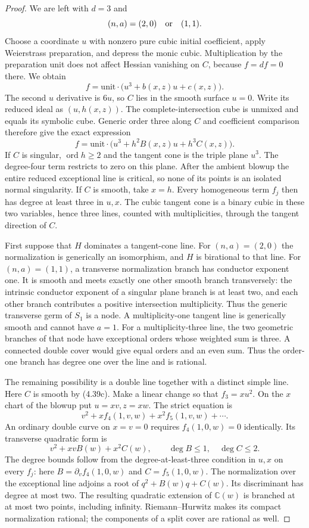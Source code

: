 \begin{proof}
We are left with $d=3$ and
\[
                   (n,a)=(2,0)\quad\hbox{or}\quad(1,1).
\]
Choose a coordinate $u$ with nonzero pure cubic initial
coefficient, apply Weierstrass preparation, and depress the
monic cubic. Multiplication by the preparation unit does not
affect Hessian vanishing on $C$, because $f=df=0$ there.
We obtain
\[
 f=\text{unit}\cdot\bigl(u^3+b(x,z)u+c(x,z)\bigr).
\]
The second $u$ derivative is $6u$, so $C$ lies in the smooth
surface $u=0$. Write its reduced ideal as $(u,h(x,z))$.
The complete-intersection cube is unmixed and equals its
symbolic cube. Generic order three along $C$ and coefficient
comparison therefore give the exact expression
\[
 f=\text{unit}\cdot
       \bigl(u^3+h^2B(x,z)u+h^3C(x,z)\bigr).           \tag{4.39c}
\]
If $C$ is singular, $\operatorname{ord}h\ge2$ and the
tangent cone is the triple plane $u^3$. The degree-four
term restricts to zero on this plane. After the ambient
blowup the entire reduced exceptional line is critical,
so none of its points is an isolated normal singularity.
If $C$ is smooth, take $x=h$. Every homogeneous term $f_j$
then has degree at least three in $u,x$. The cubic tangent
cone is a binary cubic in these two variables, hence three
lines, counted with multiplicities, through the tangent
direction of $C$.

First suppose that $H$ dominates a tangent-cone line.
For $(n,a)=(2,0)$ the normalization is generically an
isomorphism, and $H$ is birational to that line. For
$(n,a)=(1,1)$, a transverse normalization branch has conductor
exponent one. It is smooth and meets exactly one other smooth
branch transversely: the intrinsic conductor exponent of a
singular plane branch is at least two, and each other branch
contributes a positive intersection multiplicity. Thus the
generic transverse germ of $S_1$ is a node. A multiplicity-one
tangent line is generically smooth and cannot have $a=1$.
For a multiplicity-three line, the two geometric branches of
that node have exceptional orders whose weighted sum is three.
A connected double cover would give equal orders and an even
sum. Thus the order-one branch has degree one over the line
and is rational.

The remaining possibility is a double line together with a
distinct simple line. Here $C$ is smooth by (4.39c). Make a
linear change so that $f_3=xu^2$. On the $x$ chart of the
blowup put $u=xv,z=xw$. The strict equation is
\[
 v^2+x f_4(1,v,w)+x^2f_5(1,v,w)+\cdots.
\]
An ordinary double curve on $x=v=0$ requires
$f_4(1,0,w)=0$ identically. Its transverse quadratic form is
\[
 v^2+xvB(w)+x^2C(w),
 \qquad \deg B\le1,\quad\deg C\le2.                  \tag{4.39d}
\]
The degree bounds follow from the degree-at-least-three
condition in $u,x$ on every $f_j$: here
$B=\partial_v f_4(1,0,w)$ and $C=f_5(1,0,w)$.
The normalization over the exceptional line adjoins a root
of $q^2+B(w)q+C(w)$. Its discriminant has degree at most
two. The resulting quadratic extension of $\mathbb C(w)$
is branched at at most two points, including infinity.
Riemann--Hurwitz makes its compact normalization rational;
the components of a split cover are rational as well.


\end{proof}
